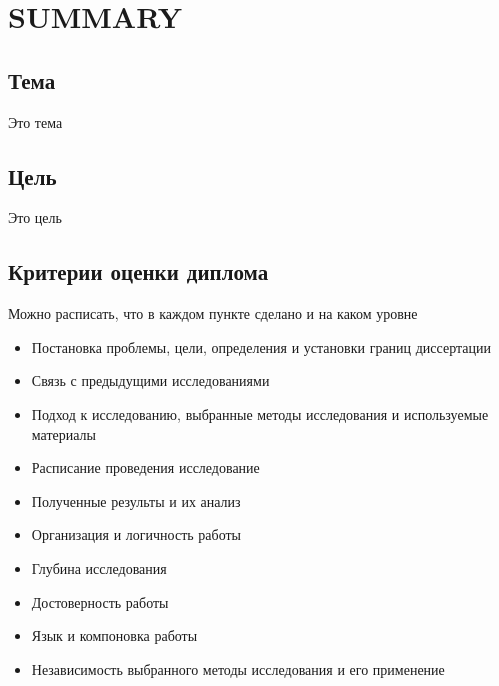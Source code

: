 \section{SUMMARY}

\subsection{Тема}
Это тема

\subsection{Цель}
Это цель

\subsection{Критерии оценки диплома}

\begin{suggestions}
Можно расписать, что в каждом пункте сделано и на каком уровне
\end{suggestions}

\begin{itemize}
  \item Постановка проблемы, цели, определения и установки границ диссертации
  \item Связь с предыдущими исследованиями
  \item Подход к исследованию, выбранные методы исследования и используемые материалы
  \item Расписание проведения исследование
  \item Полученные результы и их анализ
  \item Организация и логичность работы
  \item Глубина исследования
  \item Достоверность работы
  \item Язык и компоновка работы
  \item Независимость выбранного методы исследования и его применение
\end{itemize}
